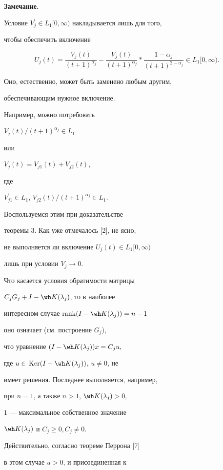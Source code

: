 {\bf Замечание.}


Условие $V_j^{\prime}\in L_1[0,\infty)$ накладывается лишь для того,


чтобы обеспечить включение


$$


U_j(t)=\frac{V_j(t)}{(t+1)^{\alpha_j}}-\frac{V_j(t)}{(t+1)^{\alpha_j}}*


\frac{1-\alpha_j}{(t+1)^{2-\alpha_j}}\in L_1[0,\infty).


$$


Оно, естественно, может быть заменено любым другим, 


обеспечивающим нужное включение.


Например, можно потребовать


$V_j(t)/(t+1)^{\alpha_j}\in L_1$


или


$V_j(t)=V_{j1}(t)+V_{j2}(t),$


где


$V_{j1}^{\prime }\in L_1$, $V_{j2}(t)/(t+1)^{\alpha_j}\in L_1$.


Воспользуемся этим при доказательстве 


теоремы 3. Как уже отмечалось [2], не ясно,


не выполняется ли включение $U_j(t)\in L_1[0,\infty)$


лишь при условии $V_j\rightarrow 0$.


\bigskip





Что касается условия обратимости матрицы


$C_j G_j+I-\wh K(\lambda_j)$, то в наиболее


интересном случае $\rank(I-\wh K(\lambda_j))=n-1$


оно означает (см. построение $G_j$),


что уравнение $(I-\wh K(\lambda_j))x=C_ju,$


где $u\in\,\text{Ker}(I-\wh K(\lambda_j))$, $u\neq 0$, не


имеет решения. Последнее выполняется, например,


при $n=1$, а также $n>1$, $\wh K(\lambda_j)>0,$


$1$ --- максимальное собственное значение


$\wh K(\lambda_j)$ и $C_j\geq 0, C_j\neq 0.$


Действительно, согласно теореме Перрона [7]


в этом случае $u>0$, и присоединенная к



